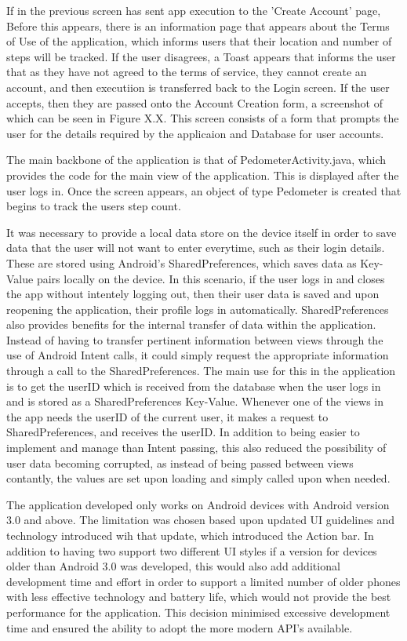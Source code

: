 \documentclass{l4proj}
\begin{document}
If in the previous screen has sent app execution to the 'Create Account' page, Before this appears, there is an information page that appears about the Terms of Use of the application, which informs users that their location and number of steps will be tracked. If the user disagrees, a Toast appears that informs the user that as they have not agreed to the terms of service, they cannot create an account, and then executiion is transferred back to the Login screen. If the user accepts, then they are passed onto the Account Creation form, a screenshot of which can be seen in Figure X.X. This screen consists of a form that prompts the user for the details required by the applicaion and Database for user accounts. 

The main backbone of the application is that of PedometerActivity.java, which provides the code for the main view of the application. This is displayed after the user logs in. Once the screen appears, an object of type Pedometer is created that begins to track the users step count.

It was necessary to provide a local data store on the device itself in order to save data that the user will not want to enter everytime, such as their login details. These are stored using Android's SharedPreferences, which saves data as Key-Value pairs locally on the device. In this scenario, if the user logs in and closes the app without intentely logging out, then their user data is saved and upon reopening the application, their profile logs in automatically. SharedPreferences also provides benefits for the internal transfer of data within the application. Instead of having to transfer pertinent information between views through the use of Android Intent calls, it could simply request the appropriate information through a call to the SharedPreferences. The main use for this in the application is to get the userID which is received from the database when the user logs in and is stored as a SharedPreferences Key-Value. Whenever one of the views in the app needs the userID of the current user, it makes a request to SharedPreferences, and receives the userID. In addition to being easier to implement and manage than Intent passing, this also reduced the possibility of user data becoming corrupted, as instead of being passed between views contantly, the values are set upon loading and simply called upon when needed.

The application developed only works on Android devices with Android version 3.0 and above. The limitation was chosen based upon updated UI guidelines and technology introduced wih that update, which introduced the Action bar. In addition to having two support two different UI styles if a version for devices older than Android 3.0 was developed, this would also add additional development time and effort in order to support a limited number of older phones with less effective technology and battery life, which would not provide the best performance for the application. This decision minimised excessive development time and ensured the ability to adopt the more modern API's available.
\end{document}
